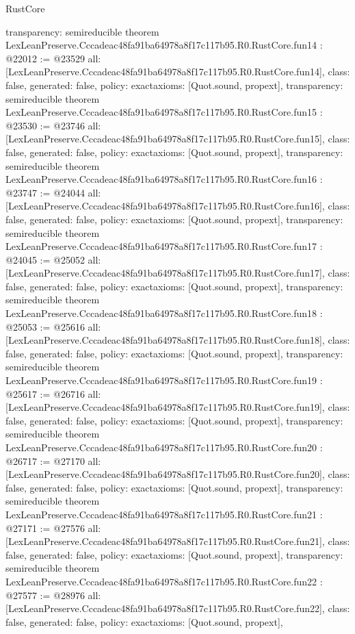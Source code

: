 \begin{lexlean}{RustCore}
\begin{coremodule}
{  transparency: semireducible
}
theorem LexLeanPreserve.Cccadeac48fa91ba64978a8f17c117b95.R0.RustCore.fun14 : @22012 := @23529 {
  all: [LexLeanPreserve.Cccadeac48fa91ba64978a8f17c117b95.R0.RustCore.fun14],
  class: false,
  generated: false,
  policy: exact{axioms: [Quot.sound, propext]},
  transparency: semireducible
}
theorem LexLeanPreserve.Cccadeac48fa91ba64978a8f17c117b95.R0.RustCore.fun15 : @23530 := @23746 {
  all: [LexLeanPreserve.Cccadeac48fa91ba64978a8f17c117b95.R0.RustCore.fun15],
  class: false,
  generated: false,
  policy: exact{axioms: [Quot.sound, propext]},
  transparency: semireducible
}
theorem LexLeanPreserve.Cccadeac48fa91ba64978a8f17c117b95.R0.RustCore.fun16 : @23747 := @24044 {
  all: [LexLeanPreserve.Cccadeac48fa91ba64978a8f17c117b95.R0.RustCore.fun16],
  class: false,
  generated: false,
  policy: exact{axioms: [Quot.sound, propext]},
  transparency: semireducible
}
theorem LexLeanPreserve.Cccadeac48fa91ba64978a8f17c117b95.R0.RustCore.fun17 : @24045 := @25052 {
  all: [LexLeanPreserve.Cccadeac48fa91ba64978a8f17c117b95.R0.RustCore.fun17],
  class: false,
  generated: false,
  policy: exact{axioms: [Quot.sound, propext]},
  transparency: semireducible
}
theorem LexLeanPreserve.Cccadeac48fa91ba64978a8f17c117b95.R0.RustCore.fun18 : @25053 := @25616 {
  all: [LexLeanPreserve.Cccadeac48fa91ba64978a8f17c117b95.R0.RustCore.fun18],
  class: false,
  generated: false,
  policy: exact{axioms: [Quot.sound, propext]},
  transparency: semireducible
}
theorem LexLeanPreserve.Cccadeac48fa91ba64978a8f17c117b95.R0.RustCore.fun19 : @25617 := @26716 {
  all: [LexLeanPreserve.Cccadeac48fa91ba64978a8f17c117b95.R0.RustCore.fun19],
  class: false,
  generated: false,
  policy: exact{axioms: [Quot.sound, propext]},
  transparency: semireducible
}
theorem LexLeanPreserve.Cccadeac48fa91ba64978a8f17c117b95.R0.RustCore.fun20 : @26717 := @27170 {
  all: [LexLeanPreserve.Cccadeac48fa91ba64978a8f17c117b95.R0.RustCore.fun20],
  class: false,
  generated: false,
  policy: exact{axioms: [Quot.sound, propext]},
  transparency: semireducible
}
theorem LexLeanPreserve.Cccadeac48fa91ba64978a8f17c117b95.R0.RustCore.fun21 : @27171 := @27576 {
  all: [LexLeanPreserve.Cccadeac48fa91ba64978a8f17c117b95.R0.RustCore.fun21],
  class: false,
  generated: false,
  policy: exact{axioms: [Quot.sound, propext]},
  transparency: semireducible
}
theorem LexLeanPreserve.Cccadeac48fa91ba64978a8f17c117b95.R0.RustCore.fun22 : @27577 := @28976 {
  all: [LexLeanPreserve.Cccadeac48fa91ba64978a8f17c117b95.R0.RustCore.fun22],
  class: false,
  generated: false,
  policy: exact{axioms: [Quot.sound, propext]},
}
\end{coremodule}
\end{lexlean}
